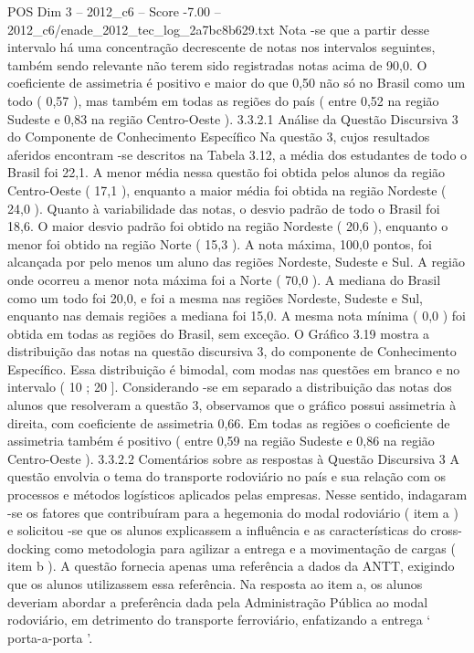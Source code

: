 \begin{textsample}{POS Dim 3 – 2012\_c6 – Score -7.00 – 2012\_c6/enade\_2012\_tec\_log\_2a7bc8b629.txt}
Nota -se que a partir desse intervalo há uma concentração decrescente de notas nos intervalos seguintes, também sendo relevante não terem sido registradas notas acima de 90,0.
O coeficiente de assimetria é positivo e maior do que 0,50 não só no Brasil como um todo ( 0,57 ), mas também em todas as regiões do país ( entre 0,52 na região Sudeste e 0,83 na região Centro-Oeste ). 3.3.2.1 Análise da Questão Discursiva 3 do Componente de Conhecimento Específico Na questão 3, cujos resultados aferidos encontram -se descritos na Tabela 3.12, a média dos estudantes de todo o Brasil foi 22,1.
A menor média nessa questão foi obtida pelos alunos da região Centro-Oeste ( 17,1 ), enquanto a maior média foi obtida na região Nordeste ( 24,0 ).
Quanto à variabilidade das notas, o desvio padrão de todo o Brasil foi 18,6.
O maior desvio padrão foi obtido na região Nordeste ( 20,6 ), enquanto o menor foi obtido na região Norte ( 15,3 ).
A nota máxima, 100,0 pontos, foi alcançada por pelo menos um aluno das regiões Nordeste, Sudeste e Sul.
A região onde ocorreu a menor nota máxima foi a Norte ( 70,0 ).
A mediana do Brasil como um todo foi 20,0, e foi a mesma nas regiões Nordeste, Sudeste e Sul, enquanto nas demais regiões a mediana foi 15,0.
A mesma nota mínima ( 0,0 ) foi obtida em todas as regiões do Brasil, sem exceção.
O Gráfico 3.19 mostra a distribuição das notas na questão discursiva 3, do componente de Conhecimento Específico.
Essa distribuição é bimodal, com modas nas questões em branco e no intervalo ( 10 ; 20 ].
Considerando -se em separado a distribuição das notas dos alunos que resolveram a questão 3, observamos que o gráfico possui assimetria à direita, com coeficiente de assimetria 0,66.
Em todas as regiões o coeficiente de assimetria também é positivo ( entre 0,59 na região Sudeste e 0,86 na região Centro-Oeste ). 3.3.2.2 Comentários sobre as respostas à Questão Discursiva 3 A questão envolvia o tema do transporte rodoviário no país e sua relação com os processos e métodos logísticos aplicados pelas empresas.
Nesse sentido, indagaram -se os fatores que contribuíram para a hegemonia do modal rodoviário ( item a ) e solicitou -se que os alunos explicassem a influência e as características do cross-docking como metodologia para agilizar a entrega e a movimentação de cargas ( item b ).
A questão fornecia apenas uma referência a dados da ANTT, exigindo que os alunos utilizassem essa referência.
Na resposta ao item a, os alunos deveriam abordar a preferência dada pela Administração Pública ao modal rodoviário, em detrimento do transporte ferroviário, enfatizando a entrega ‘ porta-a-porta ’.

\end{textsample}
